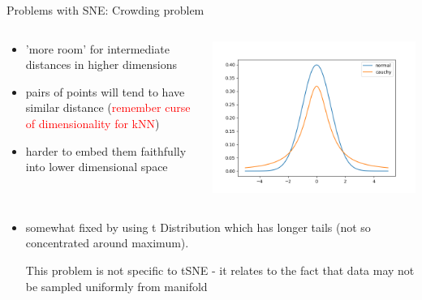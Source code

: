 \documentclass[unknownkeysallowed]{beamer}
\begin{document}
\begin{frame}{Problems with SNE: Crowding problem}

	\begin{columns}[onlytextwidth]
	\begin{column}[T]{.48\textwidth}
	\begin{itemize}[<+->]
		\item 'more room' for intermediate distances in higher dimensions

		\item pairs of points will tend to have similar distance (\textcolor{red}{remember curse of dimensionality for kNN})
		\item harder to embed them faithfully into lower dimensional space

	\end{itemize}
	\end{column}

	\begin{column}[T]{.48\textwidth}
	\includegraphics[width=\textwidth]{long_tail.png}
	\end{column}
	\end{columns}

	\begin{itemize}
	\item<4-> somewhat fixed by using t Distribution which has longer tails (not so concentrated around maximum).

	This problem is not specific to tSNE - it relates to the fact that data may not be sampled uniformly from manifold
	\end{itemize}

\end{frame}
\end{document}
